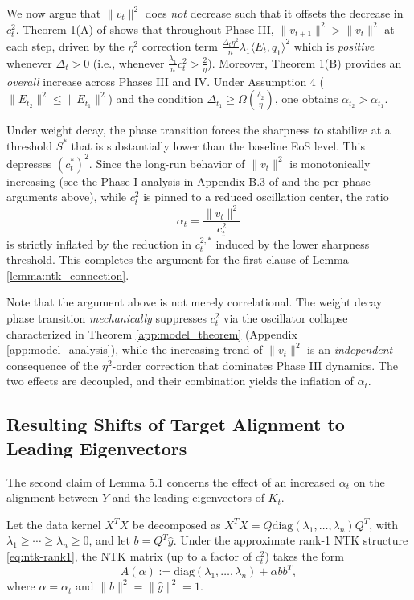 \documentclass{article}
\begin{document}
We now argue that $\|v_t\|^2$ does \emph{not} decrease such that it offsets the decrease in $c^2_t$. Theorem 1(A) of \citep{ntk_eos} shows that throughout Phase III, $\|v_{t+1}\|^2 > \|v_t\|^2$ at each step, driven by the $\eta^2$ correction term $\frac{\Delta_t \eta^2}{n}\lambda_1 \langle E_t, q_1\rangle^2$ which is \emph{positive} whenever $\Delta_t > 0$ (i.e., whenever $\frac{\lambda_1}{n}c_t^2 > \frac{2}{\eta}$). Moreover, Theorem 1(B) provides an \emph{overall} increase across Phases III and IV. Under Assumption 4 ($\|E_{t_2}\|^2 \leq \|E_{t_1}\|^2$) and the condition $\Delta_{t_1} \geq \Omega(\frac{\delta_2}{\eta})$, one obtains $\alpha_{t_2} > \alpha_{t_1}$.

Under weight decay, the phase transition forces the sharpness to stabilize at a threshold $S^*$ that is substantially lower than the baseline EoS level. This depresses $\left(c^*_t\right)^{2}$. Since the long-run behavior of $\|v_t\|^2$ is monotonically increasing (see the Phase I analysis in Appendix B.3 of \cite{ntk_eos} and the per-phase arguments above), while $c_t^2$ is pinned to a reduced oscillation center, the ratio
\[
    \alpha_t = \frac{\|v_t\|^2}{c_t^2}
\]
is strictly inflated by the reduction in $c_t^{2,*}$ induced by the lower sharpness threshold. This completes the argument for the first clause of Lemma \ref{lemma:ntk_connection}.

Note that the argument above is not merely correlational. The weight decay phase transition \emph{mechanically} suppresses $c_t^2$ via the oscillator collapse characterized in Theorem \ref{app:model_theorem} (Appendix \ref{app:model_analysis}), while the increasing trend of $\|v_t\|^2$ is an \emph{independent} consequence of the $\eta^2$-order correction that dominates Phase III dynamics. The two effects are decoupled, and their combination yields the inflation of $\alpha_t$.

\subsection{Resulting Shifts of Target Alignment to Leading Eigenvectors}

The second claim of Lemma 5.1 concerns the effect of an increased $\alpha_t$ on the alignment
between $Y$ and the leading eigenvectors of $K_t$.

Let the data kernel $X^T X$ be decomposed as $X^T X = Q\mathrm{diag}(\lambda_1, \ldots, \lambda_n)Q^T$, with $\lambda_1 \geq \cdots \geq \lambda_n \geq 0$, and let $b = Q^T \hat{y}$. Under the approximate rank-1 NTK structure \eqref{eq:ntk-rank1}, the NTK matrix (up to a factor of $c_t^2$) takes the form
\begin{equation}
    A(\alpha) := \mathrm{diag}(\lambda_1, \ldots, \lambda_n) + \alpha b b^T,
    \label{eq:A-alpha}
\end{equation}
where $\alpha = \alpha_t$ and $\|b\|^2 = \|\hat{y}\|^2 = 1$.
\end{document}

